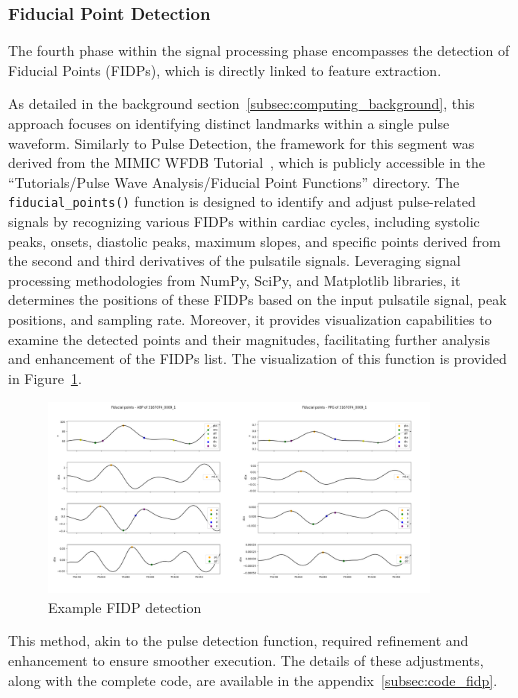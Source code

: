 \subsubsection{Fiducial Point Detection}
\label{subsubsec:fidp}

The fourth phase within the signal processing phase encompasses the detection of Fiducial Points (FIDPs), which is directly linked to feature extraction.

As detailed in the background section~\ref{subsec:computing_background}, this approach focuses on identifying distinct landmarks within a single pulse waveform.
Similarly to Pulse Detection, the framework for this segment was derived from the MIMIC WFDB Tutorial~\cite{charltonMIMICWFDBTutorials2022}, which is publicly accessible in the \enquote{Tutorials/Pulse Wave Analysis/Fiducial Point Functions} directory.
The \texttt{fiducial\_points()} function is designed to identify and adjust pulse-related signals by recognizing various FIDPs within cardiac cycles,
including systolic peaks, onsets, diastolic peaks, maximum slopes, and specific points derived from the second and third derivatives of the pulsatile signals.
Leveraging signal processing methodologies from NumPy, SciPy, and Matplotlib libraries, it determines the positions of these FIDPs based on the input pulsatile signal, peak positions, and sampling rate.
Moreover, it provides visualization capabilities to examine the detected points and their magnitudes, facilitating further analysis and enhancement of the FIDPs list.
The visualization of this function is provided in Figure~\ref{fig:wfdb_fidp}.

\begin{figure}[h]
    \includegraphics[width=0.9\textwidth]{images/methods/fidps}
    \caption{Example FIDP detection}
    \label{fig:wfdb_fidp}
\end{figure}

This method, akin to the pulse detection function, required refinement and enhancement to ensure smoother execution.
The details of these adjustments, along with the complete code, are available in the appendix~\ref{subsec:code_fidp}.

